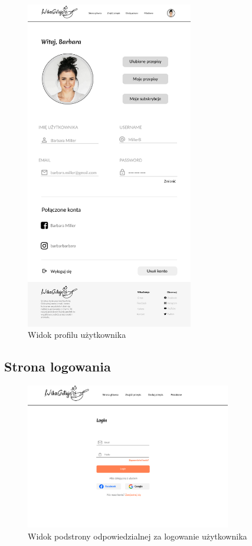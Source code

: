 \documentclass{article}
\begin{document}
\begin{figure}[H]
    \begin{center}
        \includegraphics[width=0.65\textwidth]{mockups/user_profile}
    \end{center}
    \caption{Widok profilu użytkownika}
\end{figure}
\newpage

\subsection{Strona logowania}

\begin{figure}[H]
    \begin{center}
        \includegraphics[width=0.8\textwidth]{mockups/login_page}
    \end{center}
    \caption{Widok podstrony odpowiedzialnej za logowanie użytkownika}
\end{figure}
\end{document}
